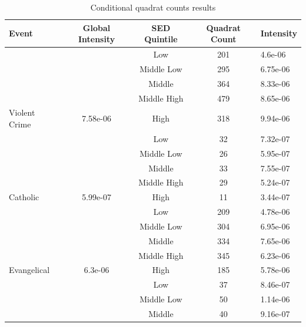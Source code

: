 \documentclass[smallextended]{svjour3}       %
\begin{document}
\begin{table}

\caption{\label{tab:table-counts-intensity-summary}\label{tab:quadrat-count-results}Conditional quadrat counts results}
\centering
\begin{tabular}[t]{lcccl}
\toprule
Event & Global Intensity & SED Quintile & Quadrat Count & Intensity\\
\midrule
 &  & Low & 201 & 4.6e-06\\

 &  & Middle Low & 295 & 6.75e-06\\

 &  & Middle & 364 & 8.33e-06\\

 &  & Middle High & 479 & 8.65e-06\\

\multirow{-5}{*}{\raggedright\arraybackslash Violent Crime} & \multirow{-5}{*}{\centering\arraybackslash 7.58e-06} & High & 318 & 9.94e-06\\
\cmidrule{1-5}
 &  & Low & 32 & 7.32e-07\\

 &  & Middle Low & 26 & 5.95e-07\\

 &  & Middle & 33 & 7.55e-07\\

 &  & Middle High & 29 & 5.24e-07\\

\multirow{-5}{*}{\raggedright\arraybackslash Catholic} & \multirow{-5}{*}{\centering\arraybackslash 5.99e-07} & High & 11 & 3.44e-07\\
\cmidrule{1-5}
 &  & Low & 209 & 4.78e-06\\

 &  & Middle Low & 304 & 6.95e-06\\

 &  & Middle & 334 & 7.65e-06\\

 &  & Middle High & 345 & 6.23e-06\\

\multirow{-5}{*}{\raggedright\arraybackslash Evangelical} & \multirow{-5}{*}{\centering\arraybackslash 6.3e-06} & High & 185 & 5.78e-06\\
\cmidrule{1-5}
 &  & Low & 37 & 8.46e-07\\

 &  & Middle Low & 50 & 1.14e-06\\

 &  & Middle & 40 & 9.16e-07\\


\end{tabular}
\end{table}
\end{document}
